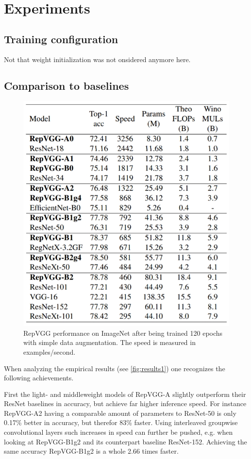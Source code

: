 \section{Experiments}

\subsection{Training configuration}

Not that weight initialization was not onsidered anymore here. 

\subsection{Comparison to baselines}

\begin{figure}[t]
	\begin{center}
		\includegraphics[width=0.8\linewidth]{images/results1.PNG}
	\end{center}
	\caption{RepVGG performance on ImageNet after being trained 120 epochs with simple data augmentation. The speed is measured in examples/second.}
	\label{fig:results1}
\end{figure}

When analyzing the empirical results (see \autoref{fig:results1}) one recognizes the following achievements. 

First the light- and middleweight models of RepVGG-A slightly outperform their ResNet baselines in accuracy, but achieve far higher inference speed. For instance RepVGG-A2 having a comparable amount of parameters to ResNet-50 is only 0.17\% better in accuracy, but therefor 83\% faster. Using interleaved groupwise convolutional layers such increases in speed can further be pushed, e.g. when looking at RepVGG-B1g2 and its counterpart baseline ResNet-152. Achieving the same accuracy RepVGG-B1g2 is a whole 2.66 times faster. 

